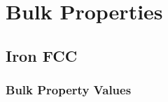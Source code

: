 \clearpage
\section{Bulk Properties}


\FloatBarrier
\subsection{Iron FCC}

\subsubsection{Bulk Property Values}

